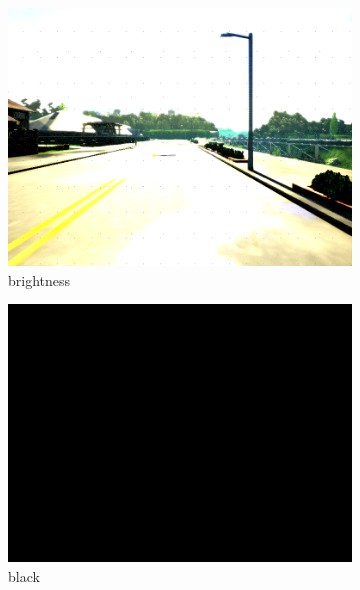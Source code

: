 \documentclass[14pt]{extarticle}
\begin{document}
\begin{figure}
\begin{subfigure}[b]{0.3\textwidth}
			 \includegraphics[scale=0.1]{./foto_sporcature/birghtness.png}
	    	 \caption{brightness}
	         \label{fig:brightness}
	     \end{subfigure}
	     \hfill
	     \begin{subfigure}[b]{0.3\textwidth}
	         \centering
			 \includegraphics[scale=0.1]{./foto_sporcature/black.png}
	         \caption{black}
	         \label{fig:black}
	     \end{subfigure}
	     \hfill
	     \begin{subfigure}[b]{0.3\textwidth}
	         \centering

\end{subfigure}
\end{figure}
\end{document}
